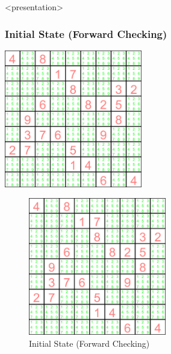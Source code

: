 \begin{frame}<presentation>
\frametitle{Initial State (Forward Checking)}
\includegraphics[width=6cm]{../sudoku/FC/frame1}
\end{frame}

\begin{figure}[ht]
\caption{\label{sudoku:initialstatefc}Initial State (Forward Checking)}
\begin{center}
\includegraphics[width=6cm]{../sudoku/FC/frame1}
\end{center}
\end{figure}


